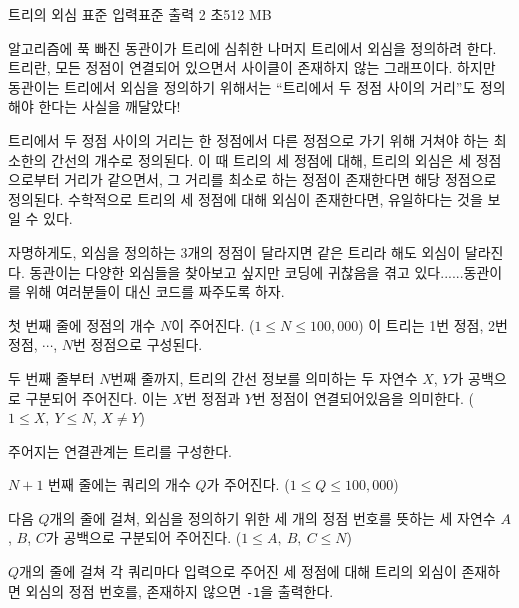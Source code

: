 \begin{problem}{트리의 외심}
    {표준 입력}{표준 출력}
    {2 초}{512 MB}{}
    
    알고리즘에 푹 빠진 동관이가 트리에 심취한 나머지 트리에서 외심을 정의하려 한다. 트리란, 모든 정점이 연결되어 있으면서 사이클이 존재하지 않는 그래프이다. 하지만 동관이는 트리에서 외심을 정의하기 위해서는 ``트리에서 두 정점 사이의 거리''도 정의해야 한다는 사실을 깨달았다!
    
    트리에서 두 정점 사이의 거리는 한 정점에서 다른 정점으로 가기 위해 거쳐야 하는 최소한의 간선의 개수로 정의된다. 이 때 트리의 세 정점에 대해, 트리의 외심은 세 정점으로부터 거리가 같으면서, 그 거리를 최소로 하는 정점이 존재한다면 해당 정점으로 정의된다. 수학적으로 트리의 세 정점에 대해 외심이 존재한다면, 유일하다는 것을 보일 수 있다.
    
    자명하게도, 외심을 정의하는 3개의 정점이 달라지면 같은 트리라 해도 외심이 달라진다. 동관이는 다양한 외심들을 찾아보고 싶지만 코딩에 귀찮음을 겪고 있다......동관이를 위해 여러분들이 대신 코드를 짜주도록 하자.
    
    \InputFile
    
    첫 번째 줄에 정점의 개수 $ N $이 주어진다. ($ 1 \leq N \leq 100,000 $) 이 트리는 1번 정점, 2번 정점, $ \cdots $, $ N $번 정점으로 구성된다.
    
    두 번째 줄부터 $ N $번째 줄까지, 트리의 간선 정보를 의미하는 두 자연수 $ X $, $ Y $가 공백으로 구분되어 주어진다. 이는 $ X $번 정점과 $ Y $번 정점이 연결되어있음을 의미한다. ($ 1 \leq X,\ Y \leq N $, $ X \neq Y $)
    
    주어지는 연결관계는 트리를 구성한다.
    
    $ N+1 $ 번째 줄에는 쿼리의 개수 $ Q $가 주어진다. ($ 1 \leq Q \leq 100,000 $)
    
    다음 $ Q $개의 줄에 걸쳐, 외심을 정의하기 위한 세 개의 정점 번호를 뜻하는 세 자연수 $ A $, $ B $, $ C $가 공백으로 구분되어 주어진다. ($ 1 \leq A,\ B,\ C \leq N $) 
    
    \OutputFile
    $ Q $개의 줄에 걸쳐 각 쿼리마다 입력으로 주어진 세 정점에 대해 트리의 외심이 존재하면 외심의 정점 번호를, 존재하지 않으면 \verb|-1|을 출력한다.
    
    \Examples
    
    \begin{example}
    \end{example}
    
\end{problem}

